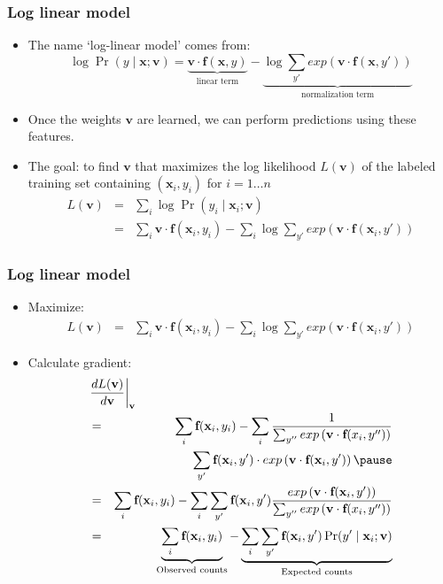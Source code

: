 \begin{frame}
\frametitle{Log linear model}
\begin{itemize}[<+->]
\item The name `log-linear model' comes from:
\[ \log \Pr(y \mid \textbf{x}; \textbf{v}) = \underbrace{\textbf{v} \cdot \textbf{f}(\textbf{x}, y)}_{\textrm{linear term}} - \underbrace{\log \sum_{y'} exp\left( \textbf{v} \cdot \textbf{f}(\textbf{x}, y') \right)}_{\textrm{normalization term}} \]
\item Once the weights $\textbf{v}$ are learned, we can perform predictions using these features.
\item The goal: to find $\textbf{v}$ that maximizes the log likelihood $L(\textbf{v})$ of the labeled training set containing $(\textbf{x}_i, y_i)$ for $i = 1 \ldots n$
\begin{eqnarray*}
L(\textbf{v}) &=& \sum_{i} \log \Pr(y_i \mid \textbf{x}_i; \textbf{v}) \\
&=& \sum_i \textbf{v} \cdot \textbf{f}(\textbf{x}_i, y_i) - \sum_i \log \sum_{y'} exp\left( \textbf{v} \cdot \textbf{f}(\textbf{x}_i, y') \right) 
\end{eqnarray*}
\end{itemize}
\end{frame}

\begin{frame}
\frametitle{Log linear model}
\begin{itemize}[<+->]
\item Maximize:
\begin{eqnarray*}
L(\textbf{v}) &=& \sum_i \textbf{v} \cdot \textbf{f}(\textbf{x}_i, y_i) - \sum_i \log \sum_{y'} exp\left( \textbf{v} \cdot \textbf{f}(\textbf{x}_i, y') \right) 
\end{eqnarray*}
\item Calculate gradient:
\begin{eqnarray*}
\lefteqn{\left. \frac{d L(\textbf{v})}{d \textbf{v}} \right|_{\textbf{v}} } \\
&=& \sum_i \textbf{f}(\textbf{x}_i, y_i) - \sum_i \frac{1}{\sum_{y''} exp\left(\textbf{v} \cdot \textbf{f}(x_i, y'')\right)} \\
&& \sum_{y'} \textbf{f}(\textbf{x}_i, y')  \cdot exp\left( \textbf{v} \cdot \textbf{f}(\textbf{x}_i, y') \right) \pause \\
&=& \sum_i \textbf{f}(\textbf{x}_i, y_i) - \sum_i \sum_{y'} \textbf{f}(\textbf{x}_i, y') \frac{exp\left( \textbf{v} \cdot \textbf{f}(\textbf{x}_i, y') \right)}{\sum_{y''} exp\left(\textbf{v} \cdot \textbf{f}(x_i, y'')\right)} \\
&=& \underbrace{\sum_i \textbf{f}(\textbf{x}_i, y_i)}_{\textrm{Observed counts}} - \underbrace{\sum_i \sum_{y'} \textbf{f}(\textbf{x}_i, y') \Pr(y' \mid \textbf{x}_i; \textbf{v})}_{\textrm{Expected counts}}
\end{eqnarray*}
\end{itemize}
\end{frame}

